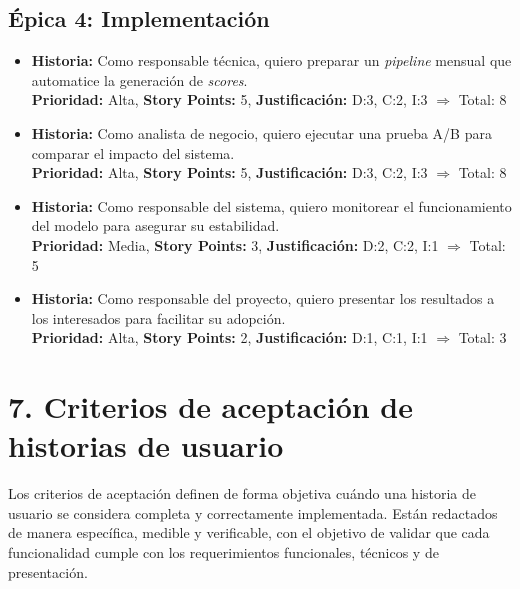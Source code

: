 \documentclass[
11pt, %
]{charter}
\begin{document}
\subsection*{\'Epica 4: Implementación}
\begin{itemize}
  \item \textbf{Historia:} Como responsable técnica, quiero preparar un \textit{pipeline} mensual que automatice la generación de \textit{scores}.\\
  \textbf{Prioridad:} Alta, \textbf{Story Points:} 5, \textbf{Justificación:} D:3, C:2, I:3 $\Rightarrow$ Total: 8

  \item \textbf{Historia:} Como analista de negocio, quiero ejecutar una prueba A/B para comparar el impacto del sistema.\\
  \textbf{Prioridad:} Alta, \textbf{Story Points:} 5, \textbf{Justificación:} D:3, C:2, I:3 $\Rightarrow$ Total: 8

  \item \textbf{Historia:} Como responsable del sistema, quiero monitorear el funcionamiento del modelo para asegurar su estabilidad.\\
  \textbf{Prioridad:} Media, \textbf{Story Points:} 3, \textbf{Justificación:} D:2, C:2, I:1 $\Rightarrow$ Total: 5

  \item \textbf{Historia:} Como responsable del proyecto, quiero presentar los resultados a los interesados para facilitar su adopción.\\
  \textbf{Prioridad:} Alta, \textbf{Story Points:} 2, \textbf{Justificación:} D:1, C:1, I:1 $\Rightarrow$ Total: 3
\end{itemize}

\section{7. Criterios de aceptación de historias de usuario}
\label{sec:criteriosAceptacion}

Los criterios de aceptación definen de forma objetiva cuándo una historia de usuario se considera completa y correctamente implementada. Están redactados de manera específica, medible y verificable, con el objetivo de validar que cada funcionalidad cumple con los requerimientos funcionales, técnicos y de presentación.
\end{document}
